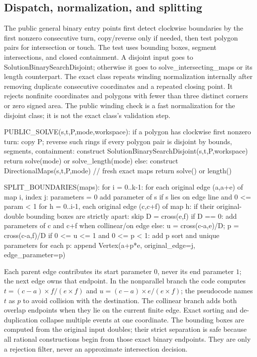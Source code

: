 \documentclass[12pt,a4paper]{article}
\newcommand{\cross}{\mathbin{\times}}
\newcommand{\code}[1]{{\ttfamily\color{codekw}#1}}
\begin{document}
\subsection{Dispatch, normalization, and splitting}
The public general binary entry points first detect clockwise boundaries by the first nonzero consecutive turn, copy/reverse only if needed, then test polygon pairs for intersection or touch. The test uses bounding boxes, segment intersections, and closed containment. A disjoint input goes to \code{SolutionBinarySearchDisjoint}; otherwise it goes to \code{solve\_intersecting\_maps} or its length counterpart. The exact class repeats winding normalization internally after removing duplicate consecutive coordinates and a repeated closing point. It rejects nonfinite coordinates and polygons with fewer than three distinct corners or zero signed area. The public winding check is a fast normalization for the disjoint class; it is not the exact class's validation step.

\begin{pseudo}
PUBLIC_SOLVE(s,t,P,mode,workspace):
  if a polygon has clockwise first nonzero turn: copy P; reverse such rings
  if every polygon pair is disjoint by bounds, segments, containment:
      construct SolutionBinarySearchDisjoint(s,t,P,workspace)
      return solve(mode) or solve_length(mode)
  else:
      construct DirectionalMaps(s,t,P,mode)   // fresh exact maps
      return solve() or length()

SPLIT_BOUNDARIES(maps):
  for i = 0..k-1:
    for each original edge (a,a+e) of map i, index j:
      parameters = {0}
      add parameter of s if s lies on edge line and 0 <= param < 1
      for h = 0..i-1, each original edge (c,c+f) of map h:
        if their original-double bounding boxes are strictly apart: skip
        D = cross(e,f)
        if D == 0: add parameters of c and c+f when collinear/on edge
        else:
          u = cross(c-a,e)/D; p = cross(c-a,f)/D
          if 0 <= u <= 1 and 0 <= p < 1: add p
      sort and unique parameters
      for each p: append Vertex(a+p*e, original_edge=j, edge_parameter=p)
\end{pseudo}

Each parent edge contributes its start parameter \(0\), never its end parameter \(1\); the next edge owns that endpoint. In the nonparallel branch the code computes \(t=(c-a)\cross f/(e\cross f)\) and \(u=(c-a)\cross e/(e\cross f)\); the pseudocode names \(t\) as \(p\) to avoid collision with the destination. The collinear branch adds both overlap endpoints when they lie on the current finite edge. Exact sorting and de-duplication collapse multiple events at one coordinate. The bounding boxes are computed from the original input doubles; their strict separation is safe because all rational constructions begin from those exact binary endpoints. They are only a rejection filter, never an approximate intersection decision.
\end{document}
